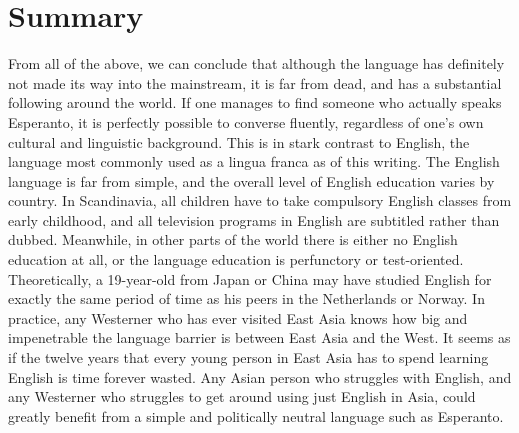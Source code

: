 
\section{Summary}
From all of the above, we can conclude that although the language has definitely not made its way into the mainstream, it is far from dead, and has a substantial following around the world.
If one manages to find someone who actually speaks Esperanto, it is perfectly possible to converse fluently, regardless of one's own cultural and linguistic background.
This is in stark contrast to English, the language most commonly used as a lingua franca as of this writing.
The English language is far from simple, and the overall level of English education varies by country.
In Scandinavia, all children have to take compulsory English classes from early childhood, and all television programs in English are subtitled rather than dubbed.
Meanwhile, in other parts of the world there is either no English education at all, or the language education is perfunctory or test-oriented.
Theoretically, a 19-year-old from Japan or China may have studied English for exactly the same period of time as his peers in the Netherlands or Norway.
In practice, any Westerner who has ever visited East Asia knows how big and impenetrable the language barrier is between East Asia and the West.
It seems as if the twelve years that every young person in East Asia has to spend learning English is time forever wasted.
Any Asian person who struggles with English, and any Westerner who struggles to get around using just English in Asia, could greatly benefit from a simple and politically neutral language such as Esperanto.


